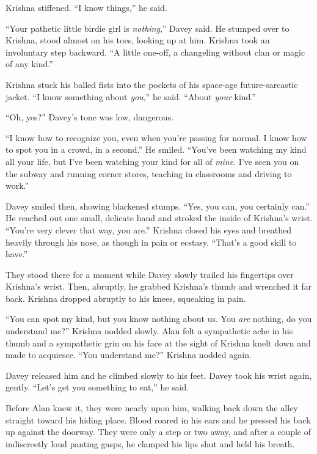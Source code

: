 \documentclass{article}
\begin{document}
Krishna stiffened.  ``I know things,'' he said.

``Your pathetic little birdie girl is \textit{nothing},'' Davey said. 
He stumped over to Krishna, stood almost on his toes, looking up at
him.  Krishna took an involuntary step backward.  ``A little one-off,
a changeling without clan or magic of any kind.''

Krishna stuck his balled fists into the pockets of his space-age
future-sarcastic jacket.  ``I know something about \textit{you},'' he
said.  ``About \textit{your} kind.''

``Oh, yes?'' Davey's tone was low, dangerous.

``I know how to recognize you, even when you're passing for normal.  I
know how to spot you in a crowd, in a second.'' He smiled.  ``You've
been watching my kind all your life, but I've been watching your kind
for all of \textit{mine}.  I've seen you on the subway and running
corner stores, teaching in classrooms and driving to work.''

Davey smiled then, showing blackened stumps.  ``Yes, you can, you
certainly can.'' He reached out one small, delicate hand and stroked
the inside of Krishna's wrist.  ``You're very clever that way, you
are.'' Krishna closed his eyes and breathed heavily through his nose,
as though in pain or ecstasy.  ``That's a good skill to have.''

They stood there for a moment while Davey slowly trailed his
fingertips over Krishna's wrist.  Then, abruptly, he grabbed Krishna's
thumb and wrenched it far back.  Krishna dropped abruptly to his
knees, squeaking in pain.

``You can spot my kind, but you know nothing about us.  You
\textit{are} nothing, do you understand me?'' Krishna nodded slowly. 
Alan felt a sympathetic ache in his thumb and a sympathetic grin on
his face at the sight of Krishna knelt down and made to acquiesce. 
``You understand me?'' Krishna nodded again.

Davey released him and he climbed slowly to his feet.  Davey took his
wrist again, gently.  ``Let's get you something to eat,'' he said.

Before Alan knew it, they were nearly upon him, walking back down the
alley straight toward his hiding place.  Blood roared in his ears and
he pressed his back up against the doorway.  They were only a step or
two away, and after a couple of indiscreetly loud panting gasps, he
clamped his lips shut and held his breath.
\end{document}
